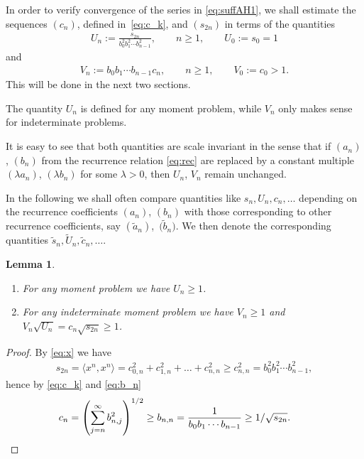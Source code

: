\documentclass[pdftex]{sigma}
\numberwithin{equation}{section}
\newtheorem{lem}[thm]{Lemma}
\begin{document}
In order to verify convergence of the series in \eqref{eq:suffAH1}, we shall estimate the sequences $(c_n)$, defined in~\eqref{eq:c_k}, and $(s_{2n})$ in terms of the quantities
\begin{gather}\label{eq:Un}
U_n:=\frac{s_{2n}}{b_0^2b_1^2\cdots b_{n-1}^2},\qquad n\ge 1,\qquad U_0:=s_0=1
\end{gather}
and
\begin{gather}\label{eq:Vn}
V_n:=b_0 b_1\cdots b_{n-1}c_n,\qquad n\ge 1,\qquad V_0:=c_0>1.
\end{gather}
This will be done in the next two sections.

The quantity $U_n$ is defined for any moment problem, while $V_n$ only makes sense for indeterminate problems.

It is easy to see that both quantities are scale invariant in the sense that if $(a_n)$, $(b_n)$ from the recurrence relation \eqref{eq:rec} are replaced by a constant multiple $(\lambda a_n)$, $(\lambda b_n)$ for some $\lambda>0$, then $U_n$, $V_n$ remain unchanged.

In the following we shall often compare quantities like $s_n,U_n,c_n,\ldots$ depending on the recurrence coefficients $(a_n)$, $(b_n)$ with those corresponding to other recurrence coefficients, say $(\tilde{a}_n)$,~$\big(\tilde{b}_n\big)$. We then denote the corresponding quantities $\tilde{s}_n,\tilde{U}_n,\tilde{c}_n,\ldots$.

\begin{lem}\label{thm:Un}\quad
\begin{enumerate}\itemsep=0pt
\item[$(i)$] For any moment problem we have $U_n\ge 1$.
 \item[$(ii)$] For any indeterminate moment problem we have $V_n\ge 1$ and $V_n\sqrt{U_n}=c_n\sqrt{s_{2n}}\ge 1$.
\end{enumerate}
\end{lem}

\begin{proof}By \eqref{eq:x} we have
\begin{gather*}
s_{2n}=\langle x^n,x^n\rangle=c_{0,n}^2+c_{1,n}^2+\dots +c_{n,n}^2 \ge c_{n,n}^2= b_0^2b_1^2\cdots b_{n-1}^2,
\end{gather*}
hence by \eqref{eq:c_k} and \eqref{eq:b_n}
\begin{gather*}
c_n=\left (\sum_{j=n}^\infty b_{n,j}^2\right )^{1/2}\ge b_{n,n}={1\over b_0b_1\cdots b_{n-1}} \ge 1/\sqrt{s_{2n}}.\tag*{\qed}
\end{gather*}\renewcommand{\qed}{}
\end{proof}
\end{document}
